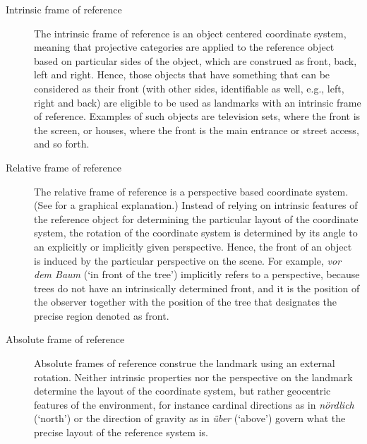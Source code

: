 \begin{description}
\item[Intrinsic frame of reference]
The intrinsic frame of reference is an object centered coordinate 
system, meaning that projective categories are applied to the 
reference object based on particular sides of the object, which 
are construed as front, back, left and right. Hence, those objects 
that have something that can be considered as their front 
(with other sides, identifiable as well, e.g., left, right and back) 
are eligible to be used as landmarks with an intrinsic frame of 
reference. Examples of such objects are television sets, where 
the front is the screen, or houses, where the front is the main 
entrance or street access, and so forth.
\item[Relative frame of reference]
The relative frame of reference is a perspective based coordinate 
system. (See  for a graphical 
explanation.) Instead of relying on intrinsic features of the 
reference object for determining the particular layout of the 
coordinate system, the rotation of the coordinate system is 
determined by its angle to an explicitly or implicitly given 
perspective. Hence, the front of an object is induced by the 
particular perspective on the scene. For example, \textit{vor dem 
Baum} (`in front of the tree') implicitly refers to a perspective, 
because trees do not have an intrinsically determined front, and 
it is the position of the observer together with the position of the 
tree that designates the precise region denoted as front.
\item[Absolute frame of reference] Absolute frames of reference construe 
the landmark using an external rotation. Neither intrinsic 
properties nor the perspective on the landmark determine the layout 
of the coordinate system, but rather geocentric features of the 
environment, for instance cardinal directions as in 
\textit{n\"ordlich} (`north') or the direction of gravity as in \textit{\"uber} (`above')
govern what the precise layout of the reference system is.
\end{description} 

